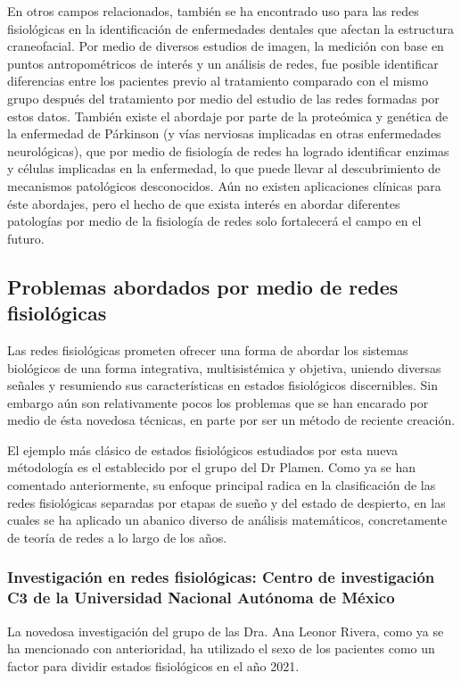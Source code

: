 \documentclass[twoside,twocolumn]{article}
\begin{document}
En otros campos relacionados, también se ha encontrado uso para las redes fisiológicas en la identificación de enfermedades dentales que afectan la estructura craneofacial\cites{scala2014complex}.
Por medio de diversos estudios de imagen, la medición con base en puntos antropométricos de interés y un análisis de redes, fue posible identificar diferencias entre los pacientes previo al tratamiento comparado con el mismo grupo después del tratamiento por medio del estudio de las redes formadas por estos datos.
También existe el abordaje por parte de la proteómica y genética de la enfermedad de Párkinson (y vías nerviosas implicadas en otras enfermedades neurológicas), que por medio de fisiología de redes ha logrado identificar enzimas y células implicadas en la enfermedad\cite{monti2018network}, lo que puede llevar al descubrimiento de mecanismos patológicos desconocidos.
Aún no existen aplicaciones clínicas para éste abordajes, pero el hecho de que exista interés en abordar diferentes patologías por medio de la fisiología de redes solo fortalecerá el campo en el futuro.

\subsection{Problemas abordados por medio de redes fisiológicas}
Las redes fisiológicas prometen ofrecer una forma de abordar los sistemas biológicos de una forma integrativa, multisistémica y objetiva, uniendo diversas señales y resumiendo sus características en estados fisiológicos discernibles\cite{ivanov2016focus}.
Sin embargo aún son relativamente pocos los problemas que se han encarado por medio de ésta novedosa técnicas, en parte por ser un método de reciente creación.

El ejemplo más clásico de estados fisiológicos estudiados por esta nueva métodología es el establecido por el grupo del Dr Plamen.
Como ya se han comentado anteriormente, su enfoque principal radica en la clasificación de las redes fisiológicas separadas por etapas de sueño y del estado de despierto, en las cuales se ha aplicado un abanico diverso de análisis matemáticos, concretamente de teoría de redes a lo largo de los años\cite{bashan2012network}\cite{lin2020dynamic}.

\subsubsection{Investigación en redes fisiológicas: Centro de investigación C3 de la Universidad Nacional Autónoma de México}
La novedosa investigación del grupo de las Dra. Ana Leonor Rivera, como ya se ha mencionado con anterioridad, ha utilizado el sexo de los pacientes como un factor para dividir estados fisiológicos en el año 2021\cite{barajas2021sex}.
\end{document}
